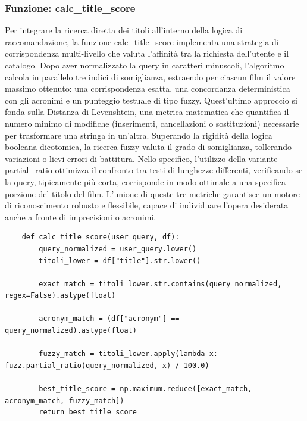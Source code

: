 \documentclass{article}
\begin{document}
\subsubsection{Funzione: calc\_title\_score}
Per integrare la ricerca diretta dei titoli all'interno della logica di raccomandazione, la funzione calc\_title\_score implementa una strategia di corrispondenza multi-livello che valuta l'affinit\`a tra la richiesta dell'utente e il catalogo. Dopo aver normalizzato la query in caratteri minuscoli, l'algoritmo calcola in parallelo tre indici di somiglianza, estraendo per ciascun film il valore massimo ottenuto: una corrispondenza esatta, una concordanza deterministica con gli acronimi e un punteggio testuale di tipo fuzzy. Quest'ultimo approccio si fonda sulla Distanza di Levenshtein, una metrica matematica che quantifica il numero minimo di modifiche (inserimenti, cancellazioni o sostituzioni) necessarie per trasformare una stringa in un'altra. Superando la rigidit\`a della logica booleana dicotomica, la ricerca fuzzy valuta il grado di somiglianza, tollerando variazioni o lievi errori di battitura. Nello specifico, l'utilizzo della variante partial\_ratio ottimizza il confronto tra testi di lunghezze differenti, verificando se la query, tipicamente pi\`u corta, corrisponde in modo ottimale a una specifica porzione del titolo del film. L'unione di queste tre metriche garantisce un motore di riconoscimento robusto e flessibile, capace di individuare l'opera desiderata anche a fronte di imprecisioni o acronimi.
\begin{lstlisting}
	def calc_title_score(user_query, df):
		query_normalized = user_query.lower()
		titoli_lower = df["title"].str.lower()
		
		exact_match = titoli_lower.str.contains(query_normalized, regex=False).astype(float)
		
		acronym_match = (df["acronym"] == query_normalized).astype(float)
		
		fuzzy_match = titoli_lower.apply(lambda x: fuzz.partial_ratio(query_normalized, x) / 100.0)
		
		best_title_score = np.maximum.reduce([exact_match, acronym_match, fuzzy_match])
		return best_title_score
\end{lstlisting}
\end{document}
